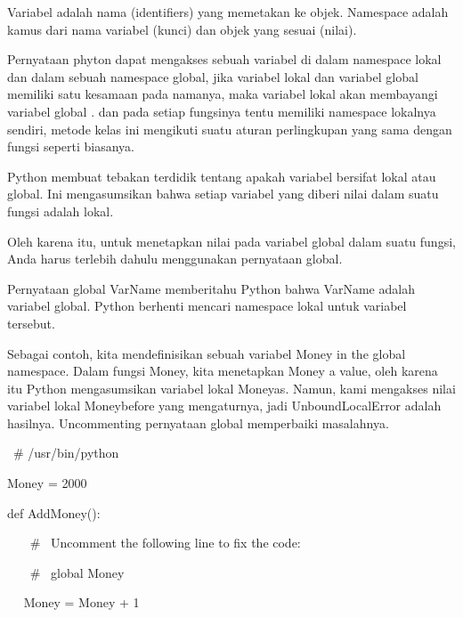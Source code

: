 \noindent 
Variabel adalah nama (identifiers) yang memetakan ke objek. Namespace adalah kamus dari nama variabel (kunci) dan objek yang sesuai (nilai). \par
\noindent 
Pernyataan phyton dapat mengakses sebuah variabel di dalam namespace lokal dan dalam sebuah namespace global, jika variabel lokal dan variabel global memiliki satu kesamaan pada namanya, maka variabel lokal akan membayangi variabel global . dan pada setiap fungsinya tentu memiliki namespace lokalnya sendiri, metode kelas ini mengikuti suatu aturan perlingkupan yang sama dengan fungsi seperti biasanya. \par
\noindent 
Python membuat tebakan terdidik tentang apakah variabel bersifat lokal atau global. Ini mengasumsikan bahwa setiap variabel yang diberi nilai dalam suatu fungsi adalah lokal. \par
\noindent 
Oleh karena itu, untuk menetapkan nilai pada variabel global dalam suatu fungsi, Anda harus terlebih dahulu menggunakan pernyataan global. \par
\noindent 
Pernyataan global VarName memberitahu Python bahwa VarName adalah variabel global. Python berhenti mencari namespace lokal untuk variabel tersebut. \par
\noindent 
Sebagai contoh, kita mendefinisikan sebuah variabel Money in the global namespace. Dalam fungsi Money, kita menetapkan Money a value, oleh karena itu Python mengasumsikan variabel lokal Moneyas. Namun, kami mengakses nilai variabel lokal Moneybefore yang mengaturnya, jadi UnboundLocalError adalah hasilnya. Uncommenting pernyataan global memperbaiki masalahnya. \par
\noindent 
 \hspace*{0.5in}  \  \#  \!/usr/bin/python \par
\vspace{12pt}
\noindent 
 \hspace*{0.5in} Money = 2000 \par
\noindent 
 \hspace*{0.5in} def AddMoney(): \par
\noindent 
 \hspace*{0.5in} ~~  \  \#  \ Uncomment the following line to fix the code: \par
\noindent 
 \hspace*{0.5in} ~~  \  \#  \ global Money \par
\noindent 
 \hspace*{0.5in} ~~ Money = Money + 1 \par
